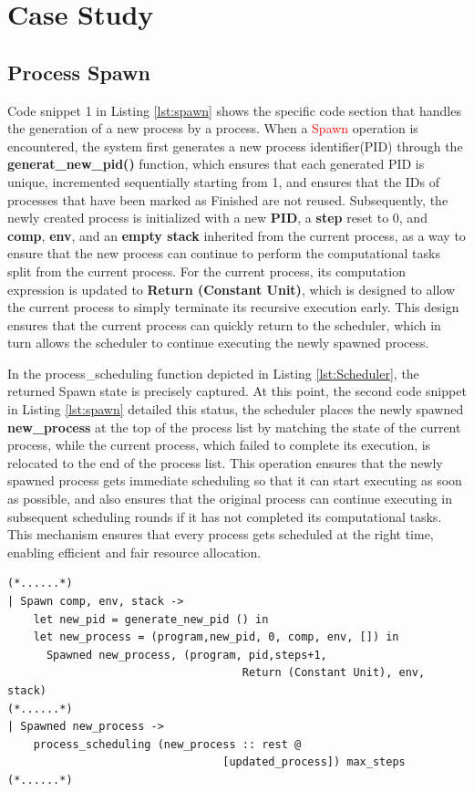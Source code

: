 \documentclass{l4proj}
\begin{document}
\section{Case Study}

\subsection{Process Spawn}

Code snippet 1 in Listing \ref{lst:spawn} shows the specific code section that handles the generation of a new process by a process. When a \textcolor{red}{Spawn} operation is encountered, the system first generates a new process identifier(PID) through the \textbf{generat\_new\_pid()} function, which ensures that each generated PID is unique, incremented sequentially starting from 1, and ensures that the IDs of processes that have been marked as Finished are not reused. Subsequently, the newly created process is initialized with a new \textbf{PID}, a \textbf{step} reset to 0, and \textbf{comp}, \textbf{env}, and an \textbf{empty stack} inherited from the current process, as a way to ensure that the new process can continue to perform the computational tasks split from the current process. For the current process, its computation expression is updated to \textbf{Return (Constant Unit)}, which is designed to allow the current process to simply terminate its recursive execution early. This design ensures that the current process can quickly return to the scheduler, which in turn allows the scheduler to continue executing the newly spawned process.

In the process\_scheduling function depicted in Listing \ref{lst:Scheduler}, the returned Spawn state is precisely captured. At this point, the second code snippet in Listing \ref{lst:spawn} detailed this status, the scheduler places the newly spawned \textbf{new\_process} at the top of the process list by matching the state of the current process, while the current process, which failed to complete its execution, is relocated to the end of the process list. This operation ensures that the newly spawned process gets immediate scheduling so that it can start executing as soon as possible, and also ensures that the original process can continue executing in subsequent scheduling rounds if it has not completed its computational tasks. This mechanism ensures that every process gets scheduled at the right time, enabling efficient and fair resource allocation.

\noindent\begin{minipage}{\linewidth}
\lstset{style=Ocamlstyle,}
\begin{lstlisting}[caption={Process spawning mechanism in Pat}, label={lst:spawn}]
(*......*)
| Spawn comp, env, stack ->
    let new_pid = generate_new_pid () in
    let new_process = (program,new_pid, 0, comp, env, []) in
      Spawned new_process, (program, pid,steps+1, 
                                    Return (Constant Unit), env, stack)
(*......*)
| Spawned new_process -> 
    process_scheduling (new_process :: rest @ 
                                 [updated_process]) max_steps
(*......*)
\end{lstlisting}
\end{minipage}
\end{document}
